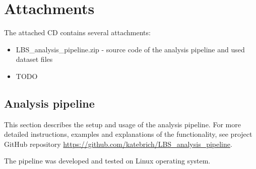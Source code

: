 \documentclass[12pt,a4paper]{report}
\begin{document}
\appendix
\chapter{Attachments}

\singlespacing

The attached CD contains several attachments:
\begin{itemize}
\item LBS\_analysis\_pipeline.zip - source code of the analysis pipeline and used dataset files
\item TODO

\end{itemize}


\section{Analysis pipeline} \label{a:pipeline}
This section describes the setup and usage of the analysis pipeline. For more detailed instructions, examples and explanations of the functionality, see project GitHub repository \url{https://github.com/katebrich/LBS_analysis_pipeline}.

The pipeline was developed and tested on Linux operating system.
\end{document}
